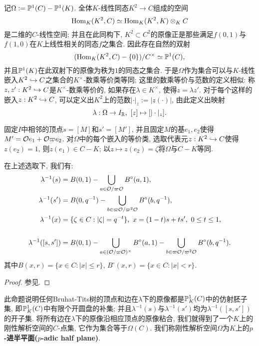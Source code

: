记$\Omega := \P^1(C) - \P^1(K)$. 全体$K$-线性同态$K^2\to C$组成的空间
\[\Hom_K(K^2, C)\simeq\Hom_K(K^2, K)\otimes_K C\]
是二维的$C$-线性空间; 并且在此同构下, $K^2\subset C^2$的原像正是那些满足$f(0, 1)$与$f(1, 0)$在$K$上线性相关的同态$f$之集合.
因此存在自然的双射\[(\Hom_K(K^2, C) - \{0\})/C^\times\simeq \P^1(C),\]
并且$\P^1(K)$在此双射下的原像为秩为$1$的同态之集合.
于是$\Omega$作为集合可以与$K$-线性嵌入$K^2\inject C$之集合的$K^\times$-数乘等价类等同; 这里的数乘等价与范数的定义相似: 称$z, z':K^2\inject C$是$K^\times$-数乘等价的, 如果存在$\lambda\in K^\times$, 使得$z = \lambda z'$.
对于每个这样的嵌入$z : K^2\inject C$, 可以定义出$K^2$上的范数$|\cdot|_z:= |z(\cdot)|$,
由此定义出映射\[\lambda : \Omega\to I_\R,\ [z]\mapsto [|\cdot|_z].\]

\begin{proposition}\label{preimages of lambda are affinoid}
    固定$I$中相邻的顶点$s = [M]$和$s' = [M']$, 并且固定$M$的基$e_1, e_2$使得$M' = \O e_1 + \O \varpi e_2 $.
    对$\Omega$中的每个嵌入的等价类, 选取代表元$z : K^2\inject C$使得$z(e_2) = 1$, 则$z(e_1)\in C - K$;
    以$z\mapsto z(e_2) = \zeta$将$\Omega$与$C - K$等同.

    在上述选取下, 我们有:
    \begin{align*}
        \lambda^{-1}(s) &= B(0, 1) - \bigcup_{a\in\O/\varpi\O} B^\circ(a, 1),\\
        \lambda^{-1}(s') &= B(0, q^{-1}) - \bigcup_{b\in\varpi\O/\varpi^2\O} B^\circ(b, q^{-1}),\\
        \lambda^{-1}(x) &= \{\zeta \in C : |\zeta| = q^{-t}\},\ x = (1-t)s + ts',\ 0\le t\le 1,\\
        &\\
        \lambda^{-1}([s, s']) &= B(0, 1) - \bigcup_{a\in(\O/\varpi\O)^\times} B^\circ(a, 1) - \bigcup_{b\in\varpi\O/\varpi^2\O} B^\circ(b, q^{-1}). 
    \end{align*}
    其中$B(x, r) = \{x\in C : |x|\le r\}$, $B^\circ(x, r) = \{x\in C : |x| < r\}$.
\end{proposition}
\begin{proof}
    参见\cite[Chapter I, (2.3)]{BC91}.
\end{proof}
此命题说明任何Bruhat-Tits树的顶点和边在$\lambda$下的原像都是$\P^1_K(C)$中的仿射胚子集,
即$\P^1_K(C)$中有限个开圆盘的补集; 并且$\lambda^{-1}(s)$与$\lambda^{-1}(s')$均为$\lambda^{-1}([s, s'])$的开子集.
将所有边在$\lambda$下的原像沿相应顶点的原像粘合, 我们就得到了一个$K$上的刚性解析空间的$C$-点集, 它作为集合等于$\Omega(C)$.
我们称刚性解析空间$\Omega$为$K$上的\textbf{$p$-进半平面($p$-adic half plane)}.

